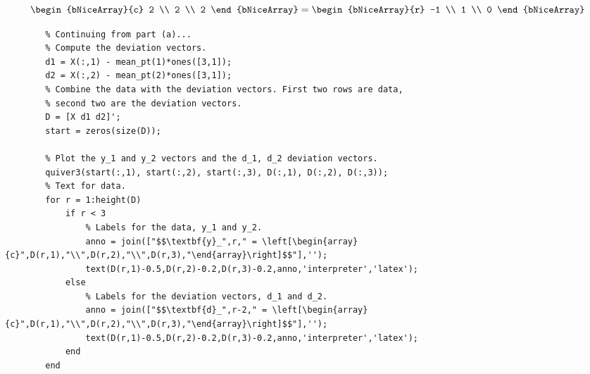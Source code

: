 \begin{enumerate}[label=(\alph*)]
\[\begin{bNiceArray}{c}
            2 \\
            2 \\
            2
        \end{bNiceArray}
        =
        \begin{bNiceArray}{r}
            -1 \\
            1 \\
            0
        \end{bNiceArray}
    \]
    \begin{lstlisting}
        % Continuing from part (a)...
        % Compute the deviation vectors.
        d1 = X(:,1) - mean_pt(1)*ones([3,1]);
        d2 = X(:,2) - mean_pt(2)*ones([3,1]);
        % Combine the data with the deviation vectors. First two rows are data,
        % second two are the deviation vectors.
        D = [X d1 d2]';
        start = zeros(size(D));
        
        % Plot the y_1 and y_2 vectors and the d_1, d_2 deviation vectors.
        quiver3(start(:,1), start(:,2), start(:,3), D(:,1), D(:,2), D(:,3));
        % Text for data.
        for r = 1:height(D)
            if r < 3
                % Labels for the data, y_1 and y_2.
                anno = join(["$$\textbf{y}_",r," = \left[\begin{array}{c}",D(r,1),"\\",D(r,2),"\\",D(r,3),"\end{array}\right]$$"],'');
                text(D(r,1)-0.5,D(r,2)-0.2,D(r,3)-0.2,anno,'interpreter','latex');
            else
                % Labels for the deviation vectors, d_1 and d_2.
                anno = join(["$$\textbf{d}_",r-2," = \left[\begin{array}{c}",D(r,1),"\\",D(r,2),"\\",D(r,3),"\end{array}\right]$$"],'');
                text(D(r,1)-0.5,D(r,2)-0.2,D(r,3)-0.2,anno,'interpreter','latex');
            end
        end
    \end{lstlisting}


\end{enumerate}
